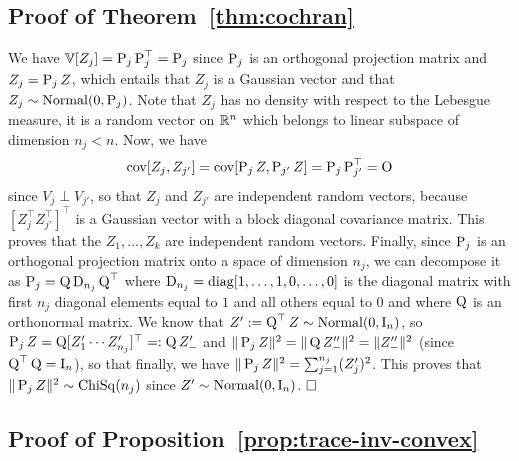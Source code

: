 \subsection{Proof of Theorem~\ref{thm:cochran}} %


We have $\var[Z_j] = \bP_j \bP_j^\top = \bP_j$ since $\bP_j$ is an orthogonal projection matrix and $Z_j = \bP_j Z$, which entails that $Z_j$ is a Gaussian vector%
%
and that $Z_j \sim \nor(0, \bP_j)$.
Note that $Z_j$ has no density with respect to the Lebesgue measure, it is a random vector on $\R^n$ which belongs to linear subspace of dimension $n_j < n$. 
Now, we have
\begin{equation*}
	\cov[Z_j, Z_{j'}] = \cov[\bP_j Z, \bP_{j'} Z] = \bP_j \bP_{j'}^\top = \bO
\end{equation*}
%
since $V_j \perp V_{j'}$, so that $Z_j$ and $Z_{j'}$ are independent random vectors, because 
$[Z_j^\top Z_{j'}^\top]^\top$ is a Gaussian vector with a block diagonal covariance matrix.
This proves that the $Z_1, \ldots, Z_k$ are independent random vectors.
Finally, since $\bP_j$ is an orthogonal projection matrix onto a space of dimension $n_j$, we can decompose it as $\bP_j = \bQ \bD_{n_j} \bQ^\top$ where $\bD_{n_j} = \diag[1, \ldots, 1, 0, \ldots, 0]$ is the diagonal matrix with first $n_j$ diagonal elements equal to $1$ and all others equal to $0$ and where $\bQ$ is an orthonormal matrix.
We know that $Z' := \bQ^\top Z \sim \nor(0, \bI_n)$, so $\bP_j Z = \bQ [Z_1' \cdots Z_{n_j}']^\top =: \bQ Z_-'$ and $\norm{\bP_j Z}^2 = \norm{\bQ Z_-''}^2 = \norm{Z_-''}^2$ (since $\bQ^\top \bQ = \bI_n$), so that finally, we have $\norm{\bP_j Z}^2 = \sum_{j=1}^{n_j} (Z_j')^2$.
This proves that $\norm{\bP_j Z}^2 \sim \chisq(n_j)$ since $Z' \sim \nor(0, \bI_n)$.
$\hfill \square$


\subsection{Proof of Proposition~\ref{prop:trace-inv-convex}} %
\label{sub:proof_of_proposition_prop:trace-inv-convex}

